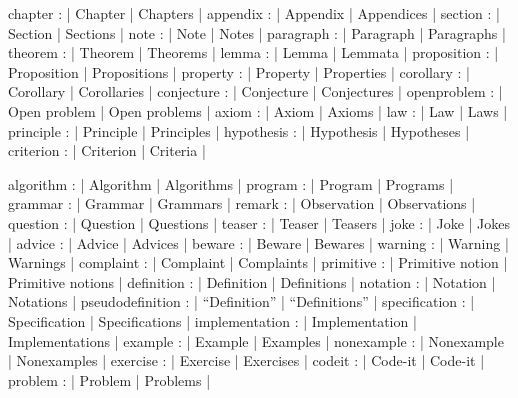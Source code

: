 \DefNoun  chapter           : | Chapter            | Chapters                   |
\DefNoun  appendix          : | Appendix           | Appendices                 |
\DefNoun  section           : | Section            | Sections                   |
\DefNoun  note              : | Note               | Notes                      |
\DefNoun  paragraph         : | Paragraph          | Paragraphs                 |
\DefNoun  theorem           : | Theorem            | Theorems                   |
\DefNoun  lemma             : | Lemma              | Lemmata                    |
\DefNoun  proposition       : | Proposition        | Propositions               |
\DefNoun  property          : | Property           | Properties                 |
\DefNoun  corollary         : | Corollary          | Corollaries                |
\DefNoun  conjecture        : | Conjecture         | Conjectures                |
\DefNoun  openproblem       : | {Open problem}     | {Open problems}            |
\DefNoun  axiom             : | Axiom              | Axioms                     |
\DefNoun  law               : | Law                | Laws                       |
\DefNoun  principle         : | Principle          | Principles                 |
\DefNoun  hypothesis        : | Hypothesis         | Hypotheses                 |
\DefNoun  criterion         : | Criterion          | Criteria                   |

\DefNoun  algorithm         : | Algorithm          | Algorithms                 |
\DefNoun  program           : | Program            | Programs                   |
\DefNoun  grammar           : | Grammar            | Grammars                   |
\DefNoun  remark            : | Observation        | Observations               |
\DefNoun  question          : | Question           | Questions                  |
\DefNoun  teaser            : | Teaser             | Teasers                    |
\DefNoun  joke              : | Joke               | Jokes                      |
\DefNoun  advice            : | Advice             | Advices                    |
\DefNoun  beware            : | Beware             | Bewares                    |
\DefNoun  warning           : | Warning            | Warnings                   |
\DefNoun  complaint         : | Complaint          | Complaints                 |
\DefNoun  primitive         : | {Primitive notion} | {Primitive notions}        |
\DefNoun  definition        : | Definition         | Definitions                |
\DefNoun  notation          : | Notation           | Notations                  |
\DefNoun  pseudodefinition  : | ``Definition''     | ``Definitions''            |
\DefNoun  specification     : | Specification      | Specifications             |
\DefNoun  implementation    : | Implementation     | Implementations            |
\DefNoun  example           : | Example            | Examples                   |
\DefNoun  nonexample        : | Nonexample         | Nonexamples                |
\DefNoun  exercise          : | Exercise           | Exercises                  |
\DefNoun  codeit            : | Code-it            | Code-it                    |
\DefNoun  problem           : | Problem            | Problems                   |

